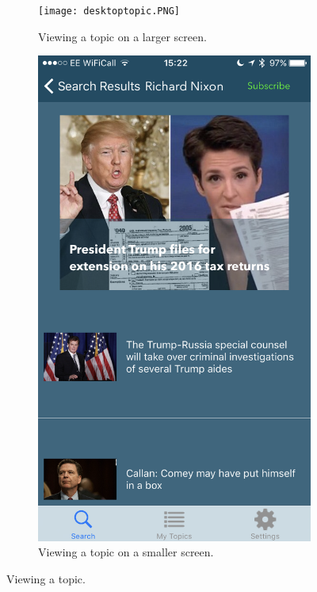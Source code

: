 \documentclass[12pt]{article}
\begin{document}
\begin{appendices}
\begin{figure}[ht!]
  \centering
  \begin{subfigure}[t]{0.6\textwidth}
        \texttt{[image: desktoptopic.PNG]}
        \caption{Viewing a topic on a larger screen.}
    \end{subfigure}
   \qquad
    \begin{subfigure}[t]{0.3\textwidth}
    \includegraphics[width=\textwidth]{phonetopic.PNG}
   \caption{Viewing a topic on a smaller screen.}
   \end{subfigure}
   \caption[Screenshots from the website and iOS Applications]{Viewing a topic.}
   \label{crosstopic}
\end{figure}


\end{appendices}
\end{document}
